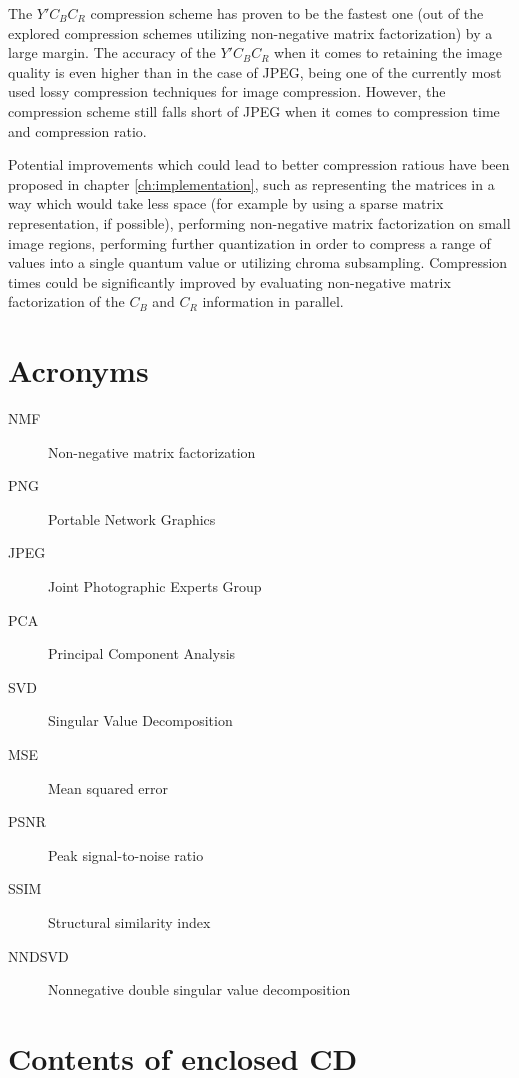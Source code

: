 \documentclass[thesis=M,english]{FITthesis}[2012/10/20]
\begin{document}
The $Y'C_BC_R$ compression scheme has proven to be the fastest one (out of the
explored compression schemes utilizing non-negative matrix factorization) by
a large margin. The accuracy of the $Y'C_BC_R$ when it comes to retaining the
image quality is even higher than in the case of JPEG, being one of the currently most
used lossy compression techniques for image compression. However, the compression
scheme still falls short of JPEG when it comes to compression time and compression
ratio.

Potential improvements which could lead to better compression ratious have been proposed
in chapter \ref{ch:implementation}, such as representing the matrices in a way
which would take less space (for example by using a sparse matrix representation, if
possible), performing non-negative matrix factorization on small image regions, performing
further quantization in order to compress a range of values into a single quantum
value or utilizing chroma subsampling. Compression times could be significantly improved
by evaluating non-negative matrix factorization of the $C_B$ and $C_R$ information in parallel.





\appendix

\chapter{Acronyms}
\begin{description}
  \item[NMF] Non-negative matrix factorization
  \item[PNG] Portable Network Graphics
  \item[JPEG] Joint Photographic Experts Group
  \item[PCA] Principal Component Analysis
  \item[SVD] Singular Value Decomposition
  \item[MSE] Mean squared error
  \item[PSNR] Peak signal-to-noise ratio
  \item[SSIM] Structural similarity index
  \item[NNDSVD] Nonnegative double singular value decomposition
\end{description}


\chapter{Contents of enclosed CD}


\begin{figure}
\end{figure}
\end{document}

